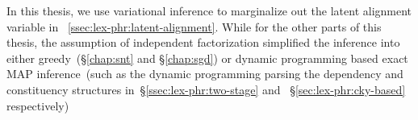In this thesis, we use variational inference to marginalize out the
latent alignment variable in
~\autoref{ssec:lex-phr:latent-alignment}. While for the other parts of
this thesis, the assumption of independent factorization simplified
the inference into either greedy~(\S\ref{chap:snt} and
\S\ref{chap:sgd}) or dynamic programming based exact MAP
inference~(such as the dynamic programming parsing the dependency and
constituency structures in~\S\ref{ssec:lex-phr:two-stage} and
~\S\ref{sec:lex-phr:cky-based} respectively)

